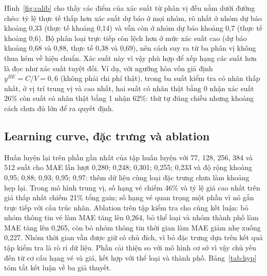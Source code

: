 \documentclass{IEEEtran}
\begin{document}
Hình~\ref{fig:calib} cho thấy các điểm của xác suất từ phân vị đều nằm dưới đường chéo: tỷ lệ thực tế thấp hơn xác suất dự báo ở mọi nhóm, rõ nhất ở nhóm dự báo khoảng 0,33 (thực tế khoảng 0,14) và vẫn còn ở nhóm dự báo khoảng 0,7 (thực tế khoảng 0,6). Bộ phân loại trực tiếp còn lệch hơn ở mức xác suất cao (dự báo khoảng 0,68 và 0,88, thực tế 0,38 và 0,69), nên cách suy ra từ ba phân vị không thua kém về hiệu chuẩn. Xác suất này vì vậy phù hợp để xếp hạng các suất hơn là đọc như xác suất tuyệt đối. Ví dụ, với ngưỡng hòa vốn giả định $y^{BE} = C/V = 0{,}6$ (không phải chi phí thật), trong ba suất kiểm tra có nhãn thấp nhất, ở vị trí trung vị và cao nhất, hai suất có nhãn thật bằng 0 nhận xác suất 26\% còn suất có nhãn thật bằng 1 nhận 62\%: thứ tự đúng chiều nhưng khoảng cách chưa đủ lớn để ra quyết định.

\begin{table}[!t]
\caption{Tóm tắt kết luận về các giả thuyết}
\label{tab:hyp}
\centering
\small
\setlength{\tabcolsep}{3pt}
\end{table}

\subsection{Learning curve, đặc trưng và ablation}
Huấn luyện lại trên phần gần nhất của tập huấn luyện với 77, 128, 256, 384 và 512 suất cho MAE lần lượt 0,280; 0,248; 0,301; 0,255; 0,233 và độ rộng khoảng 0,95; 0,88; 0,93; 0,95; 0,97: thêm dữ liệu cùng loại đặc trưng chưa làm khoảng hẹp lại. Trong mô hình trung vị, số hạng vé chiếm 46\% và tỷ lệ giá cao nhất trên giá thấp nhất chiếm 21\% tổng gain; số hạng vé quan trọng một phần vì nó gắn trực tiếp với cấu trúc nhãn. Ablation trên tập kiểm tra cho cùng kết luận: bỏ nhóm thông tin vé làm MAE tăng lên 0,264, bỏ thể loại và nhóm thành phố làm MAE tăng lên 0,265, còn bỏ nhóm thông tin thời gian làm MAE giảm nhẹ xuống 0,227. Nhóm thời gian vẫn được giữ có chủ đích, vì bỏ đặc trưng dựa trên kết quả tập kiểm tra là rò rỉ dữ liệu. Phần cải thiện so với mô hình cơ sở vì vậy chủ yếu đến từ cơ cấu hạng vé và giá, kết hợp với thể loại và thành phố. Bảng~\ref{tab:hyp} tóm tắt kết luận về ba giả thuyết.
\end{document}

